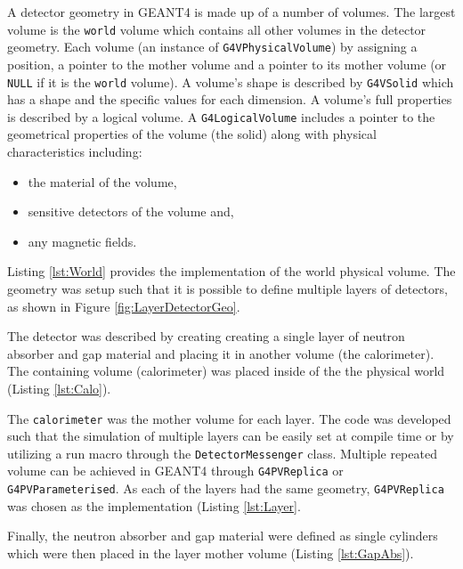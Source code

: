 A detector geometry in GEANT4 is made up of a number of volumes.
The largest volume is the \verb+world+ volume which contains all other volumes in the detector geometry.
Each volume (an instance of \verb+G4VPhysicalVolume+) by assigning a position, a pointer to the mother volume and a pointer to its mother volume (or \verb+NULL+ if it is the \verb+world+ volume).
A volume's shape is described by \verb+G4VSolid+ which has a shape and the specific values for each dimension.
A volume's full properties is described by a logical volume.
A \verb+G4LogicalVolume+ includes a pointer to the geometrical properties of the volume (the solid) along with physical characteristics including:
\begin{itemize}
    \item the material of the volume,
    \item sensitive detectors of the volume and,
    \item any magnetic fields.
\end{itemize}
Listing \ref{lst:World} provides the implementation of the world physical volume.
The geometry was setup such that it is possible to define multiple layers of detectors, as shown in Figure \ref{fig:LayerDetectorGeo}.

The detector was described by creating creating a single layer of neutron absorber and gap material and placing it in another volume (the calorimeter).
The containing volume (calorimeter) was placed inside of the the physical world (Listing \ref{lst:Calo}).

The \verb+calorimeter+ was the mother volume for each layer. 
The code was developed such that the simulation of multiple layers can be easily set at compile time or by utilizing a run macro through the \verb+DetectorMessenger+ class.
Multiple repeated volume can be achieved in GEANT4 through \verb+G4PVReplica+ or \verb+G4PVParameterised+.
As each of the layers had the same geometry, \verb+G4PVReplica+ was chosen as the implementation (Listing \ref{lst:Layer}.

Finally, the neutron absorber and gap material were defined as single cylinders which were then placed in the layer mother volume (Listing \ref{lst:GapAbs}).
